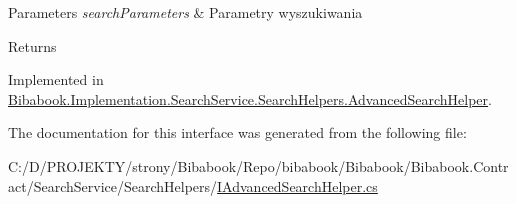 \begin{DoxyParams}{Parameters}
{\em search\+Parameters} & Parametry wyszukiwania\\
\hline
\end{DoxyParams}
\begin{DoxyReturn}{Returns}

\end{DoxyReturn}


Implemented in \hyperlink{class_bibabook_1_1_implementation_1_1_search_service_1_1_search_helpers_1_1_advanced_search_helper_ab02a91ef566b046b1c262878d1526f3f}{Bibabook.\+Implementation.\+Search\+Service.\+Search\+Helpers.\+Advanced\+Search\+Helper}.



The documentation for this interface was generated from the following file\+:\begin{DoxyCompactItemize}
\item 
C\+:/\+D/\+P\+R\+O\+J\+E\+K\+T\+Y/strony/\+Bibabook/\+Repo/bibabook/\+Bibabook/\+Bibabook.\+Contract/\+Search\+Service/\+Search\+Helpers/\hyperlink{_i_advanced_search_helper_8cs}{I\+Advanced\+Search\+Helper.\+cs}\end{DoxyCompactItemize}
